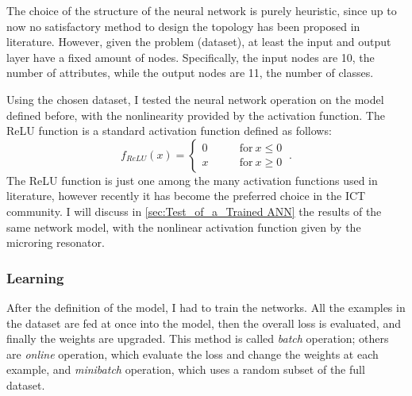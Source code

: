 The choice of the structure of the neural network is purely heuristic, since up to now no satisfactory method to design the topology has been proposed in literature.
However, given the problem (dataset), at least the input and output layer have a fixed amount of nodes.
Specifically, the input nodes are \num{10}, the number of attributes, while the output nodes are \num{11}, the number of classes.

Using the chosen dataset, I tested the neural network operation on the model defined before, with the nonlinearity provided by the  activation function.
The \acs{ReLU} function is a standard activation function defined as follows:
\begin{equation}
f_{ReLU}(x) =
\begin{cases}
	0 & \qquad \mathrm{for}~ x\leq 0\\
	x & \qquad \mathrm{for}~ x\geq 0
\end{cases}~.
\label{eq:relu}
\end{equation}
The \acs{ReLU} function is just one among the many activation functions used in literature, however recently it has become the preferred choice in the \ac{ICT} community.
I will discuss in \autoref{sec:Test_of_a_Trained ANN} the results of the same network model, with the nonlinear activation function given by the microring resonator.

\subsubsection{Learning}
After the definition of the model, I had to train the networks.
All the examples in the dataset are fed at once into the model, then the overall loss is evaluated, and finally the weights are upgraded.
This method is called \textit{batch} operation; others are \textit{online} operation, which evaluate the loss and change the weights at each example, and \textit{minibatch} operation, which uses a random subset of the full dataset.

